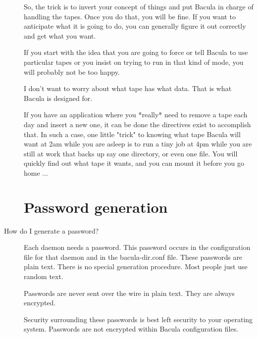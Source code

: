 \begin{description}
  So, the trick is to invert your concept of things and put Bacula in charge of
  handling the tapes.  Once you do that, you will be fine.  If you want to
  anticipate what it is going to do, you can generally figure it out correctly
  and  get what you want.  

  If you start with the idea that you are going to force or tell Bacula to use
  particular tapes or you insist on trying to run in that kind of mode, you will
  probably not be too happy.

  I don't want to worry about what tape has what data. That is what Bacula is
  designed for.

  If you have an application where you *really* need to remove a tape each day
  and  insert a new one, it can be done the directives exist to accomplish that.
  In such a case, one little "trick" to knowing what tape Bacula will want at
  2am  while you are asleep is to run a tiny job at 4pm while you are still at
  work  that backs up say one directory, or even one file. You will quickly find
  out  what tape it wants, and you can mount it before you go home ... 

\label{Password generation}
\section{Password generation}
\item [How do I generate a password?]

   Each daemon needs a password.  This password occurs in the configuration
   file for that daemon and in the bacula-dir.conf file. These passwords are
   plain text.  There is no special generation procedure.  Most people just
   use random text.

   Passwords are never sent over the wire in plain text.  They are always
   encrypted.

   Security surrounding these passwords is best left security to your
   operating system.  Passwords are not encrypted within Bacula
   configuration files.

\end{description}
        
